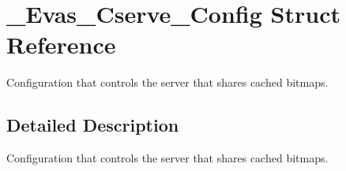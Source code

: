 \section{\_\-Evas\_\-Cserve\_\-Config Struct Reference}
\label{struct__Evas__Cserve__Config}


Configuration that controls the server that shares cached bitmaps.  




\subsection{Detailed Description}
Configuration that controls the server that shares cached bitmaps. 